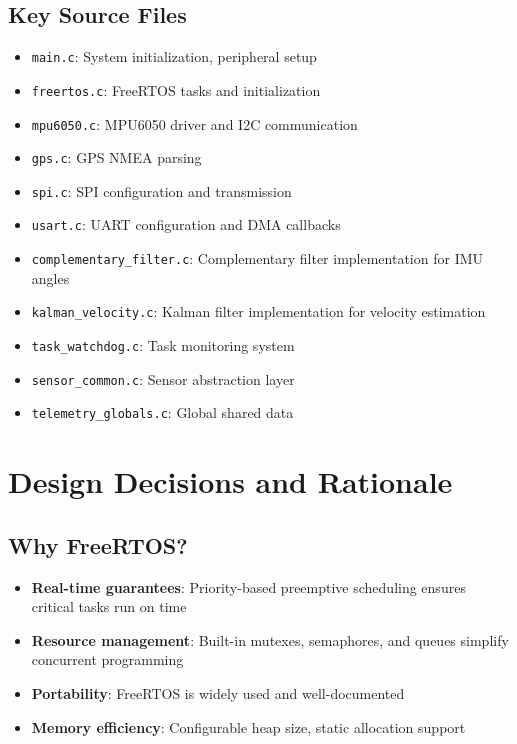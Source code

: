 \documentclass[11pt,a4paper]{article}
\begin{document}
\subsection{Key Source Files}
\begin{itemize}
    \item \texttt{main.c}: System initialization, peripheral setup
    \item \texttt{freertos.c}: FreeRTOS tasks and initialization
    \item \texttt{mpu6050.c}: MPU6050 driver and I2C communication
    \item \texttt{gps.c}: GPS NMEA parsing
    \item \texttt{spi.c}: SPI configuration and transmission
    \item \texttt{usart.c}: UART configuration and DMA callbacks
    \item \texttt{complementary\_filter.c}: Complementary filter implementation for IMU angles
    \item \texttt{kalman\_velocity.c}: Kalman filter implementation for velocity estimation
    \item \texttt{task\_watchdog.c}: Task monitoring system
    \item \texttt{sensor\_common.c}: Sensor abstraction layer
    \item \texttt{telemetry\_globals.c}: Global shared data
\end{itemize}

\section{Design Decisions and Rationale}

\subsection{Why FreeRTOS?}
\begin{itemize}
    \item \textbf{Real-time guarantees}: Priority-based preemptive scheduling ensures critical tasks run on time
    \item \textbf{Resource management}: Built-in mutexes, semaphores, and queues simplify concurrent programming
    \item \textbf{Portability}: FreeRTOS is widely used and well-documented
    \item \textbf{Memory efficiency}: Configurable heap size, static allocation support
\end{itemize}
\end{document}
